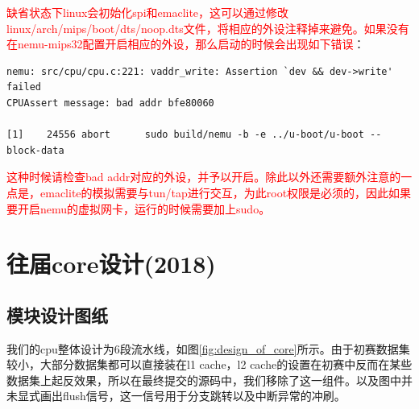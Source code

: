 \documentclass[lang=cn,11pt,a4paper]{elegantpaper}
\begin{document}
\textcolor{red}{缺省状态下linux会初始化spi和emaclite，这可以通过修改linux/arch/mips/boot/dts/noop.dts文件，将相应的外设注释掉来避免。如果没有在nemu-mips32配置开启相应的外设，那么启动的时候会出现如下错误}：
\begin{lstlisting}
nemu: src/cpu/cpu.c:221: vaddr_write: Assertion `dev && dev->write' failed
CPUAssert message: bad addr bfe80060

[1]    24556 abort      sudo build/nemu -b -e ../u-boot/u-boot --block-data
\end{lstlisting}
\textcolor{red}{这种时候请检查bad addr对应的外设，并予以开启。除此以外还需要额外注意的一点是，emaclite的模拟需要与tun/tap进行交互，为此root权限是必须的，因此如果要开启nemu的虚拟网卡，运行的时候需要加上sudo。}


\section{往届core设计(2018)}

\subsection{模块设计图纸}

我们的cpu整体设计为6段流水线，如图\ref{fig:design_of_core}所示。由于初赛数据集较小，大部分数据集都可以直接装在l1 cache，l2 cache的设置在初赛中反而在某些数据集上起反效果，所以在最终提交的源码中，我们移除了这一组件。以及图中并未显式画出flush信号，这一信号用于分支跳转以及中断异常的冲刷。
\end{document}
